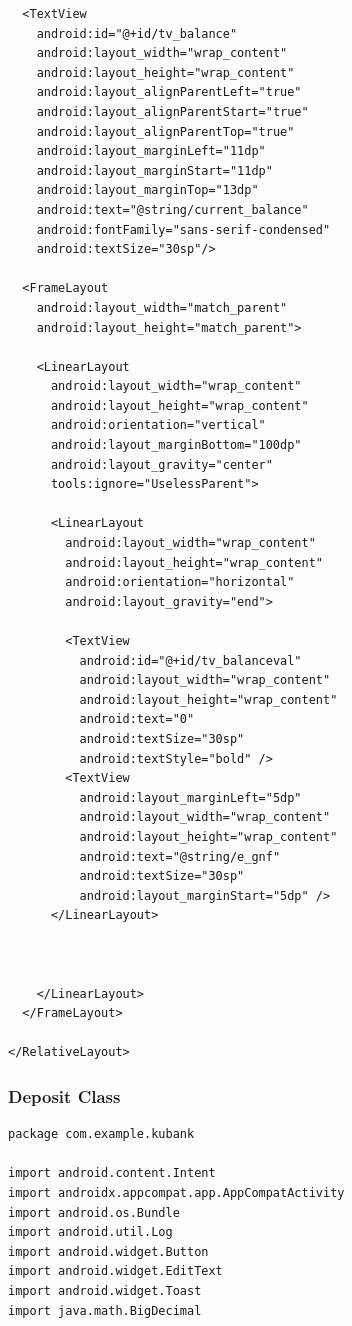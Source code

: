 \documentclass[11pt, a4paper]{article}
\begin{document}
\begin{appendices}
\begin{lstlisting}
  <TextView
    android:id="@+id/tv_balance"
    android:layout_width="wrap_content"
    android:layout_height="wrap_content"
    android:layout_alignParentLeft="true"
    android:layout_alignParentStart="true"
    android:layout_alignParentTop="true"
    android:layout_marginLeft="11dp"
    android:layout_marginStart="11dp"
    android:layout_marginTop="13dp"
    android:text="@string/current_balance"
    android:fontFamily="sans-serif-condensed"
    android:textSize="30sp"/>

  <FrameLayout
    android:layout_width="match_parent"
    android:layout_height="match_parent">

    <LinearLayout
      android:layout_width="wrap_content"
      android:layout_height="wrap_content"
      android:orientation="vertical"
      android:layout_marginBottom="100dp"
      android:layout_gravity="center"
      tools:ignore="UselessParent">

      <LinearLayout
        android:layout_width="wrap_content"
        android:layout_height="wrap_content"
        android:orientation="horizontal"
        android:layout_gravity="end">

        <TextView
          android:id="@+id/tv_balanceval"
          android:layout_width="wrap_content"
          android:layout_height="wrap_content"
          android:text="0"
          android:textSize="30sp"
          android:textStyle="bold" />
        <TextView
          android:layout_marginLeft="5dp"
          android:layout_width="wrap_content"
          android:layout_height="wrap_content"
          android:text="@string/e_gnf"
          android:textSize="30sp"
          android:layout_marginStart="5dp" />
      </LinearLayout>



    </LinearLayout>
  </FrameLayout>

</RelativeLayout>
\end{lstlisting}

\subsubsection{Deposit Class}
\begin{lstlisting}
package com.example.kubank

import android.content.Intent
import androidx.appcompat.app.AppCompatActivity
import android.os.Bundle
import android.util.Log
import android.widget.Button
import android.widget.EditText
import android.widget.Toast
import java.math.BigDecimal


\end{lstlisting}
\end{appendices}
\end{document}
